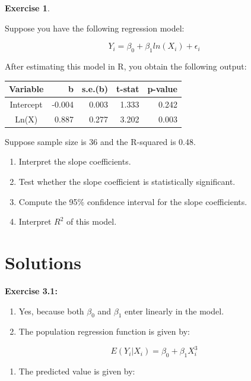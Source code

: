 \documentclass[
]{book}
\providecommand{\tightlist}{%
  \setlength{\itemsep}{0pt}\setlength{\parskip}{0pt}}
\theoremstyle{definition}
\theoremstyle{definition}
\theoremstyle{definition}
\newtheorem{exercise}{Exercise}[chapter]
\theoremstyle{definition}
\theoremstyle{remark}
\begin{document}
\begin{exercise}
\protect\hypertarget{exr:unnamed-chunk-18}{}\label{exr:unnamed-chunk-18}

Suppose you have the following regression model:

\[Y_i=\beta_0 + \beta_1 ln(X_i) +\epsilon_i\]

After estimating this model in R, you obtain the following output:

\begin{longtable}[]{@{}crrrr@{}}
\toprule\noalign{}
Variable & b & s.e.(b) & t-stat & p-value \\
\midrule\noalign{}
\endhead
\bottomrule\noalign{}
\endlastfoot
Intercept & -0.004 & 0.003 & 1.333 & 0.242 \\
Ln(X) & 0.887 & 0.277 & 3.202 & 0.003 \\
\end{longtable}

Suppose sample size is 36 and the R-squared is 0.48.

\begin{enumerate}
\def\labelenumi{\alph{enumi}.}
\item
  Interpret the slope coefficients.
\item
  Test whether the slope coefficient is statistically significant.
\item
  Compute the 95\% confidence interval for the slope coefficients.
\item
  Interpret \(R^2\) of this model.
\end{enumerate}

\end{exercise}

\hypertarget{solutions}{%
\section*{Solutions}\label{solutions}}

\textbf{Exercise 3.1:}

\begin{enumerate}
\def\labelenumi{\alph{enumi}.}
\item
  Yes, because both \(\beta_0\) and \(\beta_1\) enter linearly in the model.
\item
  The population regression function is given by:
\end{enumerate}

\[E(Y_i|X_i)=\beta_0 + \beta_1 X_i^3\]

\begin{enumerate}
\def\labelenumi{\alph{enumi}.}
\setcounter{enumi}{2}
\tightlist
\item
  The predicted value is given by:
\end{enumerate}
\end{document}
